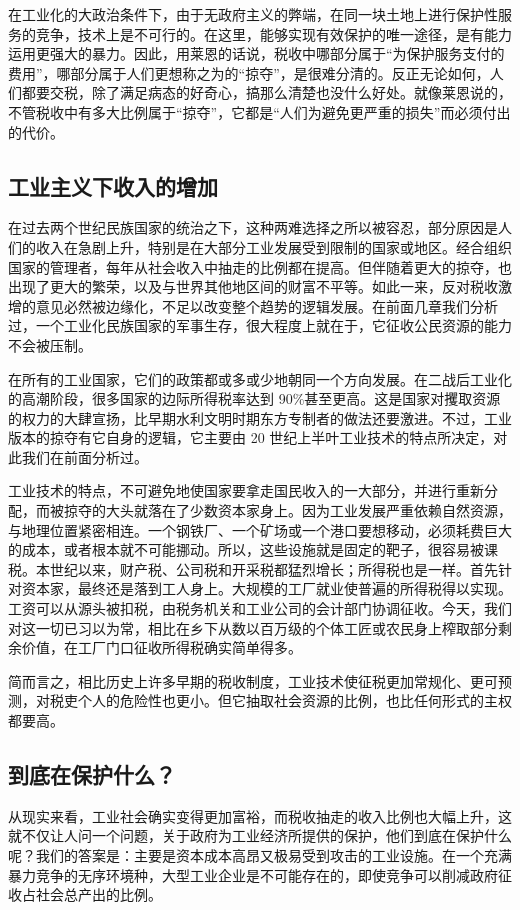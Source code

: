 在工业化的大政治条件下，由于无政府主义的弊端，在同一块土地上进行保护性服务的竞争，技术上是不可行的。在这里，能够实现有效保护的唯一途径，是有能力运用更强大的暴力。因此，用莱恩的话说，税收中哪部分属于“为保护服务支付的费用”，哪部分属于人们更想称之为的“掠夺”，是很难分清的。反正无论如何，人们都要交税，除了满足病态的好奇心，搞那么清楚也没什么好处。就像莱恩说的，不管税收中有多大比例属于“掠夺”，它都是“人们为避免更严重的损失”而必须付出的代价。

\subsection{工业主义下收入的增加}
在过去两个世纪民族国家的统治之下，这种两难选择之所以被容忍，部分原因是人们的收入在急剧上升，特别是在大部分工业发展受到限制的国家或地区。经合组织国家的管理者，每年从社会收入中抽走的比例都在提高。但伴随着更大的掠夺，也出现了更大的繁荣，以及与世界其他地区间的财富不平等。如此一来，反对税收激增的意见必然被边缘化，不足以改变整个趋势的逻辑发展。在前面几章我们分析过，一个工业化民族国家的军事生存，很大程度上就在于，它征收公民资源的能力不会被压制。

在所有的工业国家，它们的政策都或多或少地朝同一个方向发展。在二战后工业化的高潮阶段，很多国家的边际所得税率达到 90\%甚至更高。这是国家对攫取资源的权力的大肆宣扬，比早期水利文明时期东方专制者的做法还要激进。不过，工业版本的掠夺有它自身的逻辑，它主要由 20 世纪上半叶工业技术的特点所决定，对此我们在前面分析过。

工业技术的特点，不可避免地使国家要拿走国民收入的一大部分，并进行重新分配，而被掠夺的大头就落在了少数资本家身上。因为工业发展严重依赖自然资源，与地理位置紧密相连。一个钢铁厂、一个矿场或一个港口要想移动，必须耗费巨大的成本，或者根本就不可能挪动。所以，这些设施就是固定的靶子，很容易被课税。本世纪以来，财产税、公司税和开采税都猛烈增长；所得税也是一样。首先针对资本家，最终还是落到工人身上。大规模的工厂就业使普遍的所得税得以实现。工资可以从源头被扣税，由税务机关和工业公司的会计部门协调征收。今天，我们对这一切已习以为常，相比在乡下从数以百万级的个体工匠或农民身上榨取部分剩余价值，在工厂门口征收所得税确实简单得多。

简而言之，相比历史上许多早期的税收制度，工业技术使征税更加常规化、更可预测，对税吏个人的危险性也更小。但它抽取社会资源的比例，也比任何形式的主权都要高。

\subsection{到底在保护什么？}
从现实来看，工业社会确实变得更加富裕，而税收抽走的收入比例也大幅上升，这就不仅让人问一个问题，关于政府为工业经济所提供的保护，他们到底在保护什么呢？我们的答案是：主要是资本成本高昂又极易受到攻击的工业设施。在一个充满暴力竞争的无序环境种，大型工业企业是不可能存在的，即使竞争可以削减政府征收占社会总产出的比例。

